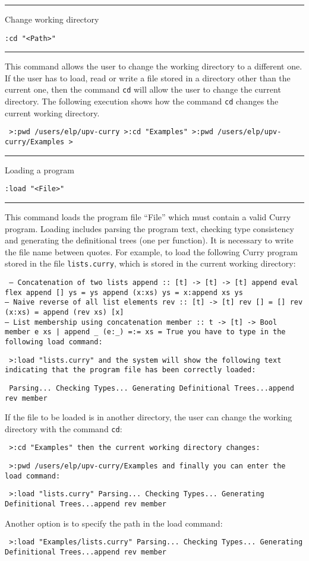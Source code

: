\documentclass[titlepage,fleqn]{article}
\makeatletter
\newenvironment{prog}{\vspace{0.7ex}\par
\setlength{\parindent}{0.7cm}
\obeylines\@vobeyspaces\tt}
{\vspace{0.7ex}\noindent}
\newcommand{\iniprog}{\begin{prog}}
\newcommand{\finprog}{\end{prog}\noindent}
\newcommand{\pr}[1]{\mbox{\tt #1}}   %
\newcommand{\uptitle}[2]{ 
{
\noindent\rule{12.12cm}{.01in}
\vspace{0.25cm}
\noindent

{\large\sf #1}

\flushright 
\vspace{-0.78cm}
{\large\tt #2}
\vspace{0.1cm}

\noindent\rule{12.12cm}{.01in}
\vspace{0.2cm}
\hspace{-0.25cm}\noindent
}
}
\newcommand{\prompt}{\pr{>}}
\makeatother
\begin{document}
\pagebreak
\uptitle{Change working directory}{:cd "<Path>"}
This command allows the user to change the working directory to a 
different one.
If the user has to load, read or write a file stored in a directory 
other than the current one, then
the command \pr{cd} will allow the user to change the current directory.
The following execution shows how the command \pr{cd} changes the current
working directory.
\iniprog
\prompt :pwd
/users/elp/upv-curry
\prompt :cd "Examples"
\prompt :pwd
/users/elp/upv-curry/Examples
\prompt 
\finprog

\uptitle{Loading a program}{:load "<File>"}
This command loads the program file ``File'' which must 
contain a valid Curry program. Loading includes parsing the program text, 
checking type consistency and generating the definitional trees
(one per function).
It is necessary to write the file name between quotes.
For example, to load the following Curry program stored in the
file \pr{lists.curry}, 
which is stored in the current working directory:
\iniprog
-- Concatenation of two lists
append :: [t] -> [t] -> [t]
append eval flex
append []     ys = ys
append (x:xs) ys = x:append xs ys\\

-- Naive reverse of all list elements
rev :: [t] -> [t]
rev []     = []
rev (x:xs) = append (rev xs) [x]\\

-- List membership using concatenation
member :: t -> [t] -> Bool
member e xs | append \_ (e:\_) =:= xs = True
\finprog
you have to type in the following load command:
\iniprog
\prompt :load "lists.curry"
\finprog
and the system will show the following text
indicating that the program file 
has been correctly loaded:
\iniprog
Parsing...
Checking Types...
Generating Definitional Trees...append rev member
\finprog

If the file to be loaded is in another directory, the user can 
change the working directory with the command \pr{cd}:
\iniprog
\prompt :cd "Examples"
\finprog
then the current working directory changes: 
\iniprog 
\prompt :pwd 
/users/elp/upv-curry/Examples 
\finprog 
and finally you can enter the load command: 
\iniprog
\prompt :load "lists.curry"
Parsing...
Checking Types...
Generating Definitional Trees...append rev member
\finprog

\noindent
Another option is to specify the path in the load command:
\iniprog
\prompt :load "Examples/lists.curry"
Parsing...
Checking Types...
Generating Definitional Trees...append rev member
\finprog
\end{document}
